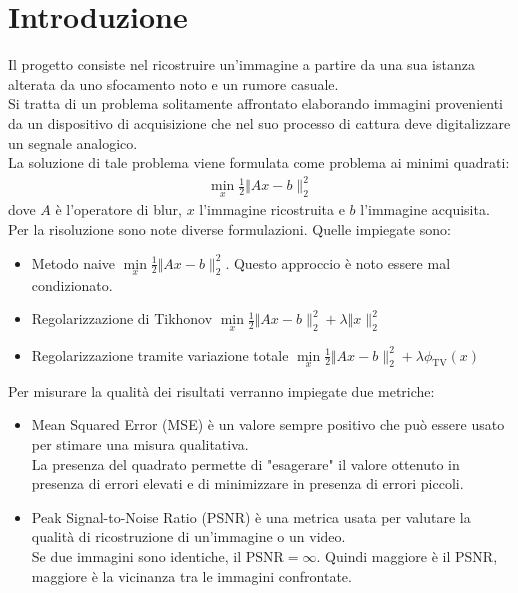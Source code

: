 \documentclass[11pt]{article}
\begin{document}
\section{Introduzione}
Il progetto consiste nel ricostruire un'immagine a partire da una sua istanza alterata da uno sfocamento noto e un rumore casuale.\\
Si tratta di un problema solitamente affrontato elaborando immagini provenienti da un dispositivo di acquisizione che nel suo processo di cattura deve digitalizzare un segnale analogico.\\ 
La soluzione di tale problema viene formulata come problema ai minimi quadrati:
\begin{align*}
    \min\limits_{x} \frac{1}{2} \Vert Ax-b \|_{2}^{2}
\end{align*}
dove $A$ è l'operatore di blur, $x$ l'immagine ricostruita e $b$ l'immagine acquisita.\\
Per la risoluzione sono note diverse formulazioni. Quelle impiegate sono:
\begin{itemize}
    \setlength\itemsep{0.05cm}
    \item Metodo naive $\min\limits_{x} \frac{1}{2} \Vert Ax-b \|_{2}^{2}$. Questo approccio è noto essere mal condizionato.
    \item Regolarizzazione di Tikhonov $\min\limits_{x} \frac{1}{2} \Vert Ax-b \|_{2}^{2} + \lambda \Vert x \|_{2}^{2}$
    \item Regolarizzazione tramite variazione totale $\min\limits_{x} \frac{1}{2} \Vert Ax-b \|_{2}^{2} + \lambda \phi_{\text{TV}}(x)$
\end{itemize}
Per misurare la qualità dei risultati verranno impiegate due metriche:
\begin{itemize}
    \setlength\itemsep{0.05cm}
    \item Mean Squared Error (MSE) è un valore sempre positivo che può essere usato per stimare una misura qualitativa. \\
    La presenza del quadrato permette di "esagerare" il valore ottenuto in presenza di errori elevati e di minimizzare in presenza di errori piccoli.
    \item Peak Signal-to-Noise Ratio (PSNR) è una metrica usata per valutare la qualità di ricostruzione di un'immagine o un video.\\
    Se due immagini sono identiche, il $\text{PSNR}=\infty$. Quindi maggiore è il PSNR, maggiore è la vicinanza tra le immagini confrontate.
\end{itemize}
\end{document}
